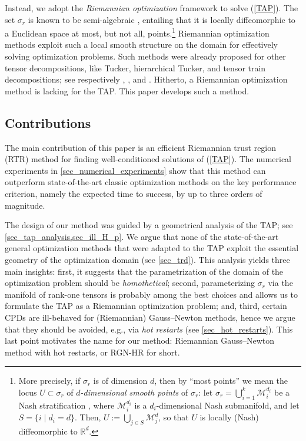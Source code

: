 \documentclass[a4paper,10pt,final]{siamart1116}
\newcommand{\Var}[1]{\mathcal{#1}}
\newcommand{\R}{\mathbb{R}}
\newcommand{\refeqn}[1]{{(\ref{#1})}}
\newcommand{\refsec}[1]{{\cref{#1}}}
\numberwithin{equation}{section}
\numberwithin{figure}{section}
\numberwithin{table}{section}
\numberwithin{theorem}{section}
\begin{document}
Instead, we adopt the \emph{Riemannian optimization} framework \cite{AMS2008} to solve \refeqn{TAP}. The set
$\sigma_r$ is known to be semi-algebraic \cite{dSL2008,BCR1998}, entailing that it is locally diffeomorphic to a Euclidean space at most, but not all, points.\footnote{More precisely, if $\sigma_r$ is of dimension $d$, then by ``most points'' we mean the locus $U \subset \sigma_r$ of \emph{$d$-dimensional smooth points} of $\sigma_r$: let $\sigma_r = \bigcup_{i=1}^k \Var{M}_i^{d_i}$ be a Nash stratification \cite[Proposition 2.9.10]{BCR1998}, where $\Var{M}_i^{d_i}$ is a $d_i$-dimensional Nash submanifold, and let $S = \{ i \;|\; d_i = d \}$. Then, $U := \bigcup_{j\in S} \Var{M}_j^d$, so that $U$ is locally (Nash) diffeomorphic to $\R^d$.}
Riemannian optimization methods \cite{AMS2008} exploit such a local smooth structure on the domain for effectively solving optimization problems. Such methods were already proposed for other tensor decompositions, like Tucker, hierarchical Tucker, and tensor train decompositions; see respectively \cite{SL2010,Ishteva2011}, \cite{UV2013,dSH2015}, and \cite{HRS2012,Steinlechner2016,KSV2014}. Hitherto, a Riemannian optimization method is lacking for the TAP. This paper develops such a method.

\subsection{Contributions}
The main contribution of this paper is an efficient Riemannian trust region (RTR) method for finding well-conditioned \cite{V2017,BV2017} solutions of \refeqn{TAP}. The numerical experiments in \refsec{sec_numerical_experiments} show that this method can outperform state-of-the-art classic optimization methods on the key performance criterion, namely the expected time to success, by up to three orders of magnitude.

The design of our method was guided by a geometrical analysis of the TAP; see \cref{sec_tap_analysis,sec_ill_H_p}.
We argue that none of the state-of-the-art general optimization methods that were adapted to the TAP exploit the essential geometry of the optimization domain (see \refsec{sec_trd}).
This analysis yields three main insights: first, it suggests that the parametrization of the domain of the optimization problem should be \emph{homothetical}; second, parameterizing $\sigma_r$ via the manifold of rank-one tensors is probably among the best choices and allows us to formulate the TAP as a Riemannian optimization problem; and, third, certain CPDs are ill-behaved for (Riemannian) Gauss--Newton methods, hence we argue that they should be avoided, e.g., via \emph{hot restarts} (see \refsec{sec_hot_restarts}). This last point motivates the name for our method: Riemannian Gauss--Newton method with hot restarts, or RGN-HR for short.
\end{document}
